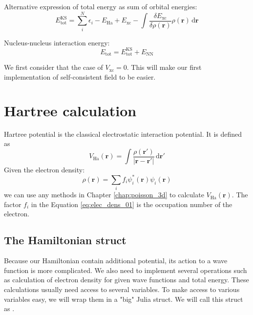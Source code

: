 Alternative expression of total energy as sum of orbital energies:
\begin{equation}
E^{\mathrm{KS}}_{\mathrm{tot}} = \sum_{i}^{N} \epsilon_{i} - E_{\mathrm{Ha}} + E_{\mathrm{xc}}
- \int \frac{\delta E_{\mathrm{xc}}}{\delta \rho(\mathbf{r})} \rho(\mathbf{r})
\,\mathrm{d}\mathbf{r}
\end{equation}

Nucleus-nucleus interaction energy:
\begin{equation}
E_{\mathrm{tot}} = E^{\mathrm{KS}}_{\mathrm{tot}} + E_{\mathrm{NN}}
\end{equation}

We first consider that the case of $V_{\mathrm{xc}}=0$. This will make our first implementation
of self-consistent field to be easier.

\section{Hartree calculation}

Hartree potential is the classical electrostatic interaction potential.
It is defined as
\begin{equation}
V_{\mathrm{Ha}}(\mathbf{r}) = \int \frac{\rho(\mathbf{r}')}{\left| \mathbf{r} - \mathbf{r}' \right|}
\,\mathrm{d}\mathbf{r}'
\end{equation}
Given the electron density:
\begin{equation}
\rho(\mathbf{r}) = \sum_{i} f_{i} \psi_{i}^{*}(\mathbf{r}) \psi_{i}(\mathbf{r})
\label{eq:elec_dens_01}
\end{equation}
we can use any methods in Chapter \ref{chap:poisson_3d} to calculate
$V_{\mathrm{Ha}}(\mathbf{r})$. The factor $f_{i}$ in the Equation \ref{eq:elec_dens_01}
is the occupation number of the electron.

\subsection{The Hamiltonian struct}

Because our Hamiltonian contain additional potential, its action to a wave function is
more complicated. We also need to implement several operations such as calculation
of electron density for given wave functions and total energy.
These calculations usually need access to several variables. To make access to various
variables easy, we will wrap them in a "big" Julia struct. We will call this struct
as .

